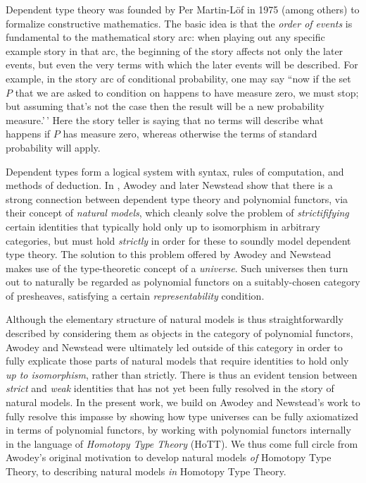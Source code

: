 \documentclass[
  11pt,
  oneside,
  article]{memoir}
\theoremstyle{definition}
\theoremstyle{plain}
\newcommand{\0}{\textsf{0}}
\newcommand{\1}{\tn{\textsf{1}}}
\begin{document}
Dependent type theory \cite{martin-lof1975intuitionistic} was founded by
Per Martin-Löf in 1975 (among others) to formalize constructive
mathematics. The basic idea is that the \emph{order of events} is
fundamental to the mathematical story arc: when playing out any specific
example story in that arc, the beginning of the story affects not only
the later events, but even the very terms with which the later events
will be described. For example, in the story arc of conditional
probability, one may say ``now if the set \(P\) that we are asked to
condition on happens to have measure zero, we must stop; but assuming
that's not the case then the result will be a new probability
measure.'\,' Here the story teller is saying that no terms will describe
what happens if \(P\) has measure zero, whereas otherwise the terms of
standard probability will apply.

Dependent types form a logical system with syntax, rules of computation,
and methods of deduction. In
\cite{awodey2014natural,awodey2018polynomial}, Awodey and later Newstead
show that there is a strong connection between dependent type theory and
polynomial functors, via their concept of \emph{natural models}, which
cleanly solve the problem of \emph{strictififying} certain identities
that typically hold only up to isomorphism in arbitrary categories, but
must hold \emph{strictly} in order for these to soundly model dependent
type theory. The solution to this problem offered by Awodey and Newstead
makes use of the type-theoretic concept of a \emph{universe}. Such
universes then turn out to naturally be regarded as polynomial functors
on a suitably-chosen category of presheaves, satisfying a certain
\emph{representability} condition.

Although the elementary structure of natural models is thus
straightforwardly described by considering them as objects in the
category of polynomial functors, Awodey and Newstead were ultimately led
outside of this category in order to fully explicate those parts of
natural models that require identities to hold only \emph{up to
isomorphism}, rather than strictly. There is thus an evident tension
between \emph{strict} and \emph{weak} identities that has not yet been
fully resolved in the story of natural models. In the present work, we
build on Awodey and Newstead's work to fully resolve this impasse by
showing how type universes can be fully axiomatized in terms of
polynomial functors, by working with polynomial functors internally in
the language of \emph{Homotopy Type Theory} (HoTT). We thus come full
circle from Awodey's original motivation to develop natural models
\emph{of} Homotopy Type Theory, to describing natural models \emph{in}
Homotopy Type Theory.
\end{document}
